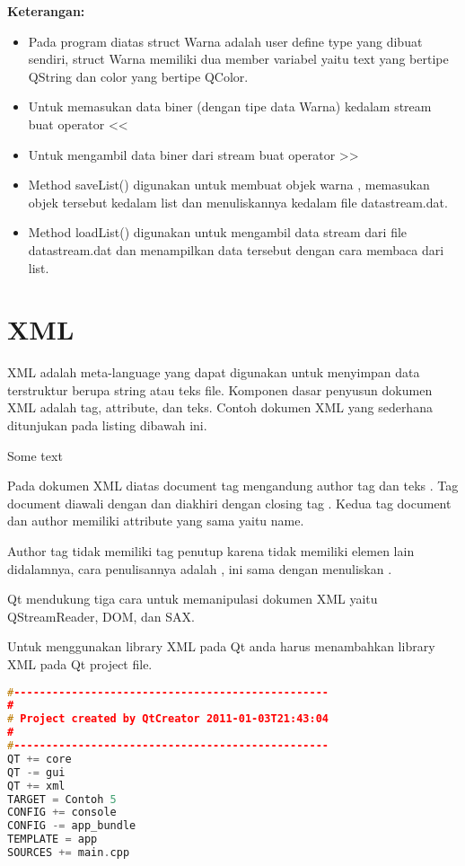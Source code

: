 \textbf{Keterangan:}

\begin{itemize}
\tightlist
\item
  Pada program diatas struct Warna adalah user define type yang dibuat
  sendiri, struct Warna memiliki dua member variabel yaitu text yang
  bertipe QString dan color yang bertipe QColor.
\item
  Untuk memasukan data biner (dengan tipe data Warna) kedalam stream
  buat operator \textless{}\textless{}
\item
  Untuk mengambil data biner dari stream buat operator
  \textgreater{}\textgreater{}
\item
  Method saveList() digunakan untuk membuat objek warna , memasukan
  objek tersebut kedalam list dan menuliskannya kedalam file
  datastream.dat.
\item
  Method loadList() digunakan untuk mengambil data stream dari file
  datastream.dat dan menampilkan data tersebut dengan cara membaca dari
  list.
\end{itemize}

\section{XML}\label{xml}

XML adalah meta-language yang dapat digunakan untuk menyimpan data
terstruktur berupa string atau teks file. Komponen dasar penyusun
dokumen XML adalah tag, attribute, dan teks. Contoh dokumen XML yang
sederhana ditunjukan pada listing dibawah ini.

 Some text

Pada dokumen XML diatas document tag mengandung author tag dan teks .
Tag document diawali dengan dan diakhiri dengan closing tag . Kedua tag
document dan author memiliki attribute yang sama yaitu name.

Author tag tidak memiliki tag penutup karena tidak memiliki elemen lain
didalamnya, cara penulisannya adalah , ini sama dengan menuliskan .

Qt mendukung tiga cara untuk memanipulasi dokumen XML yaitu
QStreamReader, DOM, dan SAX.

Untuk menggunakan library XML pada Qt anda harus menambahkan library XML
pada Qt project file.

\begin{lstlisting}[language=c++]
#-------------------------------------------------
#
# Project created by QtCreator 2011-01-03T21:43:04
#
#-------------------------------------------------
QT += core
QT -= gui
QT += xml
TARGET = Contoh 5
CONFIG += console
CONFIG -= app_bundle
TEMPLATE = app
SOURCES += main.cpp
\end{lstlisting}

